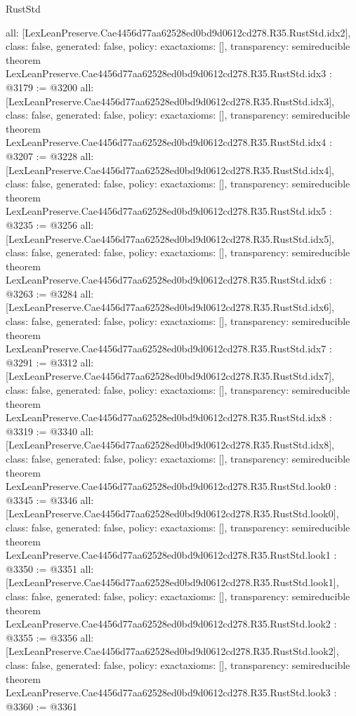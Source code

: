 \begin{lexlean}{RustStd}
\begin{coremodule}
{  all: [LexLeanPreserve.Cae4456d77aa62528ed0bd9d0612cd278.R35.RustStd.idx2],
  class: false,
  generated: false,
  policy: exact{axioms: []},
  transparency: semireducible
}
theorem LexLeanPreserve.Cae4456d77aa62528ed0bd9d0612cd278.R35.RustStd.idx3 : @3179 := @3200 {
  all: [LexLeanPreserve.Cae4456d77aa62528ed0bd9d0612cd278.R35.RustStd.idx3],
  class: false,
  generated: false,
  policy: exact{axioms: []},
  transparency: semireducible
}
theorem LexLeanPreserve.Cae4456d77aa62528ed0bd9d0612cd278.R35.RustStd.idx4 : @3207 := @3228 {
  all: [LexLeanPreserve.Cae4456d77aa62528ed0bd9d0612cd278.R35.RustStd.idx4],
  class: false,
  generated: false,
  policy: exact{axioms: []},
  transparency: semireducible
}
theorem LexLeanPreserve.Cae4456d77aa62528ed0bd9d0612cd278.R35.RustStd.idx5 : @3235 := @3256 {
  all: [LexLeanPreserve.Cae4456d77aa62528ed0bd9d0612cd278.R35.RustStd.idx5],
  class: false,
  generated: false,
  policy: exact{axioms: []},
  transparency: semireducible
}
theorem LexLeanPreserve.Cae4456d77aa62528ed0bd9d0612cd278.R35.RustStd.idx6 : @3263 := @3284 {
  all: [LexLeanPreserve.Cae4456d77aa62528ed0bd9d0612cd278.R35.RustStd.idx6],
  class: false,
  generated: false,
  policy: exact{axioms: []},
  transparency: semireducible
}
theorem LexLeanPreserve.Cae4456d77aa62528ed0bd9d0612cd278.R35.RustStd.idx7 : @3291 := @3312 {
  all: [LexLeanPreserve.Cae4456d77aa62528ed0bd9d0612cd278.R35.RustStd.idx7],
  class: false,
  generated: false,
  policy: exact{axioms: []},
  transparency: semireducible
}
theorem LexLeanPreserve.Cae4456d77aa62528ed0bd9d0612cd278.R35.RustStd.idx8 : @3319 := @3340 {
  all: [LexLeanPreserve.Cae4456d77aa62528ed0bd9d0612cd278.R35.RustStd.idx8],
  class: false,
  generated: false,
  policy: exact{axioms: []},
  transparency: semireducible
}
theorem LexLeanPreserve.Cae4456d77aa62528ed0bd9d0612cd278.R35.RustStd.look0 : @3345 := @3346 {
  all: [LexLeanPreserve.Cae4456d77aa62528ed0bd9d0612cd278.R35.RustStd.look0],
  class: false,
  generated: false,
  policy: exact{axioms: []},
  transparency: semireducible
}
theorem LexLeanPreserve.Cae4456d77aa62528ed0bd9d0612cd278.R35.RustStd.look1 : @3350 := @3351 {
  all: [LexLeanPreserve.Cae4456d77aa62528ed0bd9d0612cd278.R35.RustStd.look1],
  class: false,
  generated: false,
  policy: exact{axioms: []},
  transparency: semireducible
}
theorem LexLeanPreserve.Cae4456d77aa62528ed0bd9d0612cd278.R35.RustStd.look2 : @3355 := @3356 {
  all: [LexLeanPreserve.Cae4456d77aa62528ed0bd9d0612cd278.R35.RustStd.look2],
  class: false,
  generated: false,
  policy: exact{axioms: []},
  transparency: semireducible
}
theorem LexLeanPreserve.Cae4456d77aa62528ed0bd9d0612cd278.R35.RustStd.look3 : @3360 := @3361 {
}
\end{coremodule}
\end{lexlean}
